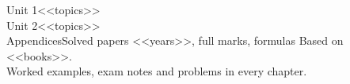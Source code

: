 \documentclass[12pt,a4paper,oneside]{book}
\begin{document}
  {Unit 1\quad <<topics>>\\[4pt]Unit 2\quad <<topics>>\\[4pt]Appendices\quad Solved papers <<years>>, full marks, formulas}
  {Based on <<books>>.\\ Worked examples, exam notes and problems in every chapter.}

\tableofcontents

\appendix
\end{document}
